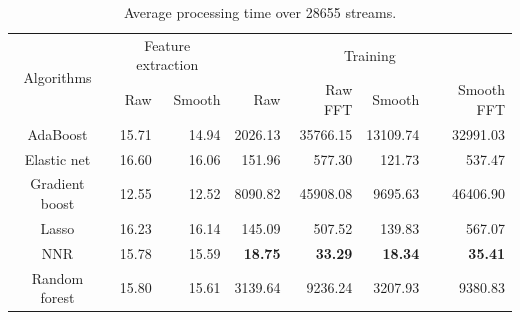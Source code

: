 \begin{table}[htpb]
   \centering
   \caption{Average processing time over 28655 streams.}
   \label{tab:timing}
   \begin{tabular}{|c|r|r|r|r|r|r|}
      \hline
      \multirow{2}{*}{Algorithms} & \multicolumn{2}{c|}{Feature extraction} &
      \multicolumn{4}{c|}{Training} \\ \cline{2-7}
                       & Raw   & Smooth & Raw            & Raw FFT        & Smooth         & Smooth FFT \\ \hline
      AdaBoost         & 15.71 & 14.94  & 2026.13        & 35766.15       & 13109.74       & 32991.03\\
      Elastic net      & 16.60 & 16.06  & 151.96         & 577.30         & 121.73         & 537.47\\
      Gradient boost   & 12.55 & 12.52  & 8090.82        & 45908.08       & 9695.63        & 46406.90\\
      Lasso            & 16.23 & 16.14  & 145.09         & 507.52         & 139.83         & 567.07\\
      NNR              & 15.78 & 15.59  & \textbf{18.75} & \textbf{33.29} & \textbf{18.34} & \textbf{35.41}\\
      Random forest    & 15.80 & 15.61  & 3139.64        & 9236.24        & 3207.93        & 9380.83\\
      \hline
   \end{tabular}
\end{table}


